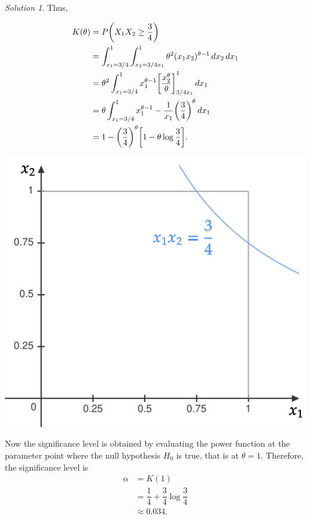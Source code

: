 \documentclass[svgnames, a5paper]{article}
\theoremstyle{definition}
\theoremstyle{remark}
\newtheorem*{Solution*}{Solution}
\begin{document}
\begin{enumerate}
\begin{Solution*}
Thus,\\
\begin{minipage}[h]{0.5\linewidth}
\begin{align*}
K(\theta) &= P\pqty{ X_1 X_2 \ge \frac 3 4 }\\
	&= \int_{x_1 = 3/4}^1 \int_{x_2 = 3/4x_1}^1 \theta^2 (x_1 x_2)^{\theta - 1} \,dx_2 \,dx_1\\
	&= \theta^2 \int_{x_1 = 3/4}^1 x_1^{\theta - 1} \bqty{\dfrac{x_2^\theta}{\theta}}_{3/4x_1}^1 \,dx_1\\
	&= \theta \int_{x_1 = 3/4}^1 x_1^{\theta - 1} - \dfrac 1 {x_1} \pqty{\dfrac 3 4}^\theta \,dx_1\\
	&= 1 - \pqty{\dfrac 3 4}^\theta \bqty{1 - \theta \log \dfrac 3 4 }.
\end{align*}
\end{minipage}\quad
\begin{minipage}{0.4\linewidth}
\includegraphics[width=0.9\linewidth]{RectangularHyperbola.pdf}
\end{minipage}

Now the significance level is obtained by evaluating the power function at the parameter point where the null hypothesis $H_0$ is true, that is at $\theta = 1$. Therefore, the significance level is
\begin{align*}
\alpha &= K(1) \\
& = \dfrac 1 4 + \dfrac 3 4 \log \dfrac 3 4 \\
& \approx 0.034.
\end{align*}
\end{Solution*}


\end{enumerate}
\end{document}
